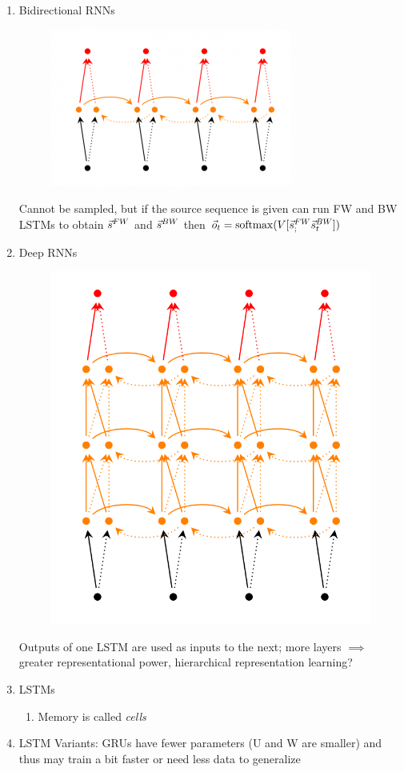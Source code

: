 \documentclass[a4paper,12pt,twoside,openright]{report}
\begin{document}
\begin{enumerate}
    \item Bidirectional RNNs
        \begin{figure}[htpb]
            \centering
            \includegraphics[width=0.8\linewidth]{Figures/bi-rnn.png}
            \caption{}
        \end{figure}
        Cannot be sampled, but if the source sequence is given can run FW and BW LSTMs
        to obtain $\vec{s}^{FW}$ and $\vec{s}^{BW}$ then $\vec{o}_t = \operatorname*{softmax}(V [\vec{s}^{FW}_; \vec{s}^{BW}_t])$
    \item Deep RNNs
        \begin{figure}[htpb]
            \centering
            \includegraphics[width=0.8\linewidth]{Figures/deep-rnn.png}
            \caption{}
        \end{figure}
        Outputs of one LSTM are used as inputs to the next; more layers $\implies$
        greater representational power, hierarchical representation learning?
    \item LSTMs
        \begin{enumerate}
            \item Memory is called \emph{cells}
        \end{enumerate}

    \item LSTM Variants: GRUs have fewer parameters (U and W are smaller) and
        thus may train a bit faster or need less data to generalize
\end{enumerate}
\end{document}
